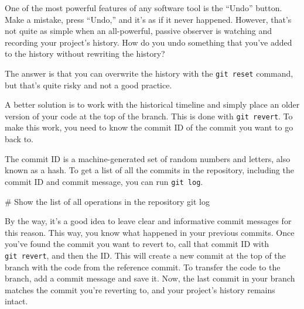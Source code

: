 \documentclass[
  letterpaper,
  DIV=11,
  numbers=noendperiod]{scrreprt}
\newenvironment{Shaded}{\begin{snugshade}}{\end{snugshade}}
\newcommand{\NormalTok}[1]{\textcolor[rgb]{0.00,0.23,0.31}{#1}}
\begin{document}
One of the most powerful features of any software tool is the ``Undo''
button. Make a mistake, press ``Undo,'' and it's as if it never
happened. However, that's not quite as simple when an all-powerful,
passive observer is watching and recording your project's history. How
do you undo something that you've added to the history without rewriting
the history?

The answer is that you can overwrite the history with the
\texttt{git\ reset} command, but that's quite risky and not a good
practice.

A better solution is to work with the historical timeline and simply
place an older version of your code at the top of the branch. This is
done with \texttt{git\ revert}. To make this work, you need to know the
commit ID of the commit you want to go back to.

The commit ID is a machine-generated set of random numbers and letters,
also known as a hash. To get a list of all the commits in the
repository, including the commit ID and commit message, you can run
\texttt{git\ log}.

\begin{Shaded}
\begin{Highlighting}[]
\NormalTok{\# Show the list of all operations in the repository}
\NormalTok{git log}
\end{Highlighting}
\end{Shaded}

By the way, it's a good idea to leave clear and informative commit
messages for this reason. This way, you know what happened in your
previous commits. Once you've found the commit you want to revert to,
call that commit ID with \texttt{git\ revert}, and then the ID. This
will create a new commit at the top of the branch with the code from the
reference commit. To transfer the code to the branch, add a commit
message and save it. Now, the last commit in your branch matches the
commit you're reverting to, and your project's history remains intact.
\end{document}
